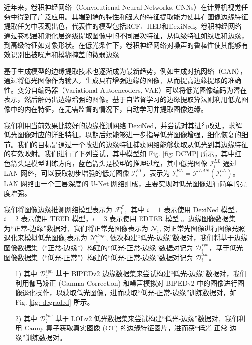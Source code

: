 \documentclass[a4paper]{ctexart}
\begin{document}
	近年来，卷积神经网络（Convolutional Neural Networks, CNNs）在计算机视觉任务中得到了广泛应用。其端到端的特性和强大的特征提取能力使其在图像边缘特征提取任务中表现出色，代表性的模型包括RCF、HED和DexiNed。卷积神经网络通过卷积层和池化层逐级提取图像中的不同层次特征，从低级特征如纹理和边缘，到高级特征如对象形状。在低光条件下，卷积神经网络对噪声的鲁棒性使其能够有效识别出被噪声和模糊掩盖的微弱边缘
	
	基于生成模型的边缘提取技术也逐渐成为最新趋势，例如生成对抗网络（GAN），通过将低光图像作为输入，生成具有增强边缘的图像，从而提高边缘提取的准确性。变分自编码器（Variational Autoencoders, VAE）可以将低光图像编码为潜在表示，然后解码出边缘增强的图像。基于自监督学习的边缘提取算法则利用低光图像中的内在特征，在无需监督的情况下，自动学习并提取图像边缘。
	
	我们利用当前效果比较好的边缘推测网络 DexiNed，并尝试对其进行改进，求解低光图像对应的详细特征，以期后续能够进一步指导低光图像增强，细化恢复的细节。我们的目标是通过一个改进的边缘特征捕获网络能够获取从低光到其边缘特征的有效映射。我们进行了下列尝试，其中模型如 Fig. \ref{fig: DCMP} 所示，其中红色箭头是模型训练方向，蓝色箭头是模型的推理过程，其中低光图像 $\mathcal{I}_{i}^{LL}$ 通过 LAN 网络，可以获取初步增强的低光图像 $\mathcal{I}_{i}^{EL}$，表示为 $\mathcal{I}_{i}^{EL} = \mathcal{F}^{LAN} (\mathcal{I}_{i}^{LL})$。LAN 网络由一个三层深度的 U-Net 网络组成，主要实现对低光图像进行简单的亮度增强。
	
	我们将图像边缘推测网络模型表示为 $\mathcal{F}_{i}^{\mathcal{E}}$，其中 $i=1$ 表示使用 DexiNed \cite{Soria_2023}模型，$i=2$ 表示使用 TEED \cite{soria2023tiny}模型，$i=3$ 表示使用 EDTER \cite{pu2022edter}模型 。边缘图像数据集为“正常-边缘”数据对，我们将正常光图像表示为 $\mathcal{N}_{i}$, 对正常光图像进行图像光照退化来模拟低光图像,表示为 $\mathcal{N}_{i}^{dege}$, 依次构建“低光-边缘”数据对，我们将基于边缘图像数据集（“正常-边缘”）构建的“低光-正常-边缘”数据对记为 $\mathcal{D}_{i}^{syn}$，基于低光图像数据集（“低光-正常”）构建的“低光-正常-边缘”数据对记为 $\mathcal{D}_{i}^{low}$。
	
	\begin{itemize}
		\item[1)]
		其中 $\mathcal{D}_{2}^{syn}$ 基于 BIPEDv2 边缘数据集来尝试构建“低光-边缘”数据对，我们利用伽马矫正 (Gamma Correction) 和噪声模拟对 BIPEDv2 中的图像进行图像退化操作，以获取低光图像，进而获取“低光-正常-边缘”训练数据对，如 Fig. \ref{fig: degraded} 所示。
		
		\item[2)]
		其中 $\mathcal{D}_{2}^{low}$ 基于 LOLv2 低光数据集来尝试构建“低光-边缘”数据对，我们利用 Canny 算子获取真实图像 (GT) 的边缘特征图片，进而获“低光-正常-边缘”训练数据对。
	\end{itemize}
	
\end{document}
